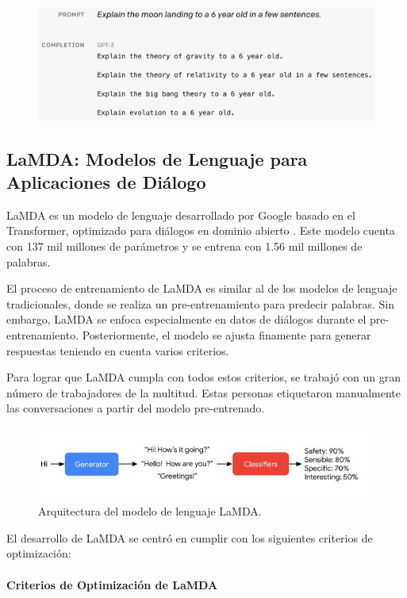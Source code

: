  \begin{figure}[h]
        	\includegraphics[scale = 0.34]{pics/lmnotuserassistant.png}
        \end{figure}

\subsection{LaMDA: Modelos de Lenguaje para Aplicaciones de Diálogo}
LaMDA es un modelo de lenguaje desarrollado por Google basado en el Transformer, optimizado para diálogos en dominio abierto \cite{thoppilan2022lamda}. Este modelo cuenta con 137 mil millones de parámetros y se entrena con 1.56 mil millones de palabras.

El proceso de entrenamiento de LaMDA es similar al de los modelos de lenguaje tradicionales, donde se realiza un pre-entrenamiento para predecir palabras. Sin embargo, LaMDA se enfoca especialmente en datos de diálogos durante el pre-entrenamiento. Posteriormente, el modelo se ajusta finamente para generar respuestas teniendo en cuenta varios criterios.

Para lograr que LaMDA cumpla con todos estos criterios, se trabajó con un gran número de trabajadores de la multitud. Estas personas etiquetaron manualmente las conversaciones a partir del modelo pre-entrenado.

\begin{figure}[h]
	\centering
	\includegraphics[scale = 0.5]{pics/lambda.png}
	\caption{Arquitectura del modelo de lenguaje LaMDA.}
\end{figure}

El desarrollo de LaMDA se centró en cumplir con los siguientes criterios de optimización:

\paragraph{Criterios de Optimización de LaMDA}

